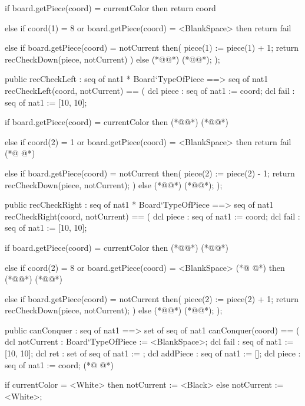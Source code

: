 \begin{vdmpp}[breaklines=true]
  if board.getPiece(coord) = currentColor
  then return coord
  
  else if coord(1) = 8 or board.getPiece(coord) = <BlankSpace>
  then return fail
  
  else if board.getPiece(coord) = notCurrent
  then(
   piece(1) := piece(1) + 1;
   return recCheckDown(piece, notCurrent)
  ) 
  else (*@@*) (*@@*);
 );
 
 public recCheckLeft : seq of nat1 * Board`TypeOfPiece ==> seq of nat1
 recCheckLeft(coord, notCurrent) ==
 ( 
  dcl piece : seq of nat1 := coord;
  dcl fail : seq of nat1 := [10, 10];
   
  if board.getPiece(coord) = currentColor
  then (*@@*) (*@@*)
  
  else if coord(2) = 1 or board.getPiece(coord) = <BlankSpace>
  then return fail
(*@
\label{recCheckUp:122}
@*)
  
  else if board.getPiece(coord) = notCurrent
  then(
   piece(2) := piece(2) - 1;
   return recCheckDown(piece, notCurrent);
  ) 
  else (*@@*) (*@@*);
 );
 
 public recCheckRight : seq of nat1 * Board`TypeOfPiece ==> seq of nat1
 recCheckRight(coord, notCurrent) ==
 ( 
  dcl piece : seq of nat1 := coord;
  dcl fail : seq of nat1 := [10, 10];
   
  if board.getPiece(coord) = currentColor
  then (*@@*) (*@@*)
  
  else if coord(2) = 8 or board.getPiece(coord) = <BlankSpace>
(*@
\label{recCheckDown:141}
@*)
  then (*@@*) (*@@*)
  
  else if board.getPiece(coord) = notCurrent
  then(
   piece(2) := piece(2) + 1;
   return recCheckDown(piece, notCurrent);
  ) 
  else (*@@*) (*@@*);
 );
 
 
 public canConquer : seq of nat1 ==> set of seq of nat1
 canConquer(coord) ==
 ( 
  dcl notCurrent : Board`TypeOfPiece := <BlankSpace>;
  dcl fail : seq of nat1 := [10, 10];
  dcl ret : set of seq of nat1 := {};
  dcl addPiece : seq of nat1 := [];
  dcl piece : seq of nat1 := coord; 
(*@
\label{recCheckLeft:160}
@*)
  
  
  
  if currentColor = <White>
  then notCurrent := <Black>
  else notCurrent := <White>;
  


\end{vdmpp}
